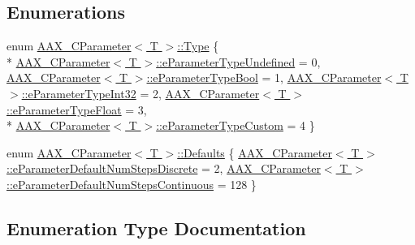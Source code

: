 \subsection*{Enumerations}
\begin{DoxyCompactItemize}
\item 
enum \hyperlink{a00344_ga04704f13b4367b9e7430217d06c5e4bd}{A\+A\+X\+\_\+\+C\+Parameter$<$ T $>$\+::\+Type} \{ \\*
\hyperlink{a00344_gga04704f13b4367b9e7430217d06c5e4bda15a8b9cd0a4d3acf30c476c7924b1753}{A\+A\+X\+\_\+\+C\+Parameter$<$ T $>$\+::e\+Parameter\+Type\+Undefined} = 0, 
\hyperlink{a00344_gga04704f13b4367b9e7430217d06c5e4bda9ae3d0eca8e95a572dba6daaf52144c0}{A\+A\+X\+\_\+\+C\+Parameter$<$ T $>$\+::e\+Parameter\+Type\+Bool} = 1, 
\hyperlink{a00344_gga04704f13b4367b9e7430217d06c5e4bda28e7aa1254f43cd377f0a0b9d2f29306}{A\+A\+X\+\_\+\+C\+Parameter$<$ T $>$\+::e\+Parameter\+Type\+Int32} = 2, 
\hyperlink{a00344_gga04704f13b4367b9e7430217d06c5e4bda82c99fa80b68022242f17adbc1dbf0dc}{A\+A\+X\+\_\+\+C\+Parameter$<$ T $>$\+::e\+Parameter\+Type\+Float} = 3, 
\\*
\hyperlink{a00344_gga04704f13b4367b9e7430217d06c5e4bda3503351122f63c767ca33d70aef69557}{A\+A\+X\+\_\+\+C\+Parameter$<$ T $>$\+::e\+Parameter\+Type\+Custom} = 4
 \}
\item 
enum \hyperlink{a00344_ga6bd5a5ddc796fa3a9de77157bf444ca8}{A\+A\+X\+\_\+\+C\+Parameter$<$ T $>$\+::\+Defaults} \{ \hyperlink{a00344_gga6bd5a5ddc796fa3a9de77157bf444ca8a511ee79dc3b6322b2facb41b2663be30}{A\+A\+X\+\_\+\+C\+Parameter$<$ T $>$\+::e\+Parameter\+Default\+Num\+Steps\+Discrete} = 2, 
\hyperlink{a00344_gga6bd5a5ddc796fa3a9de77157bf444ca8a54c0d050e5b34d4eb85c840168ec4567}{A\+A\+X\+\_\+\+C\+Parameter$<$ T $>$\+::e\+Parameter\+Default\+Num\+Steps\+Continuous} = 128
 \}
\end{DoxyCompactItemize}


\subsection{Enumeration Type Documentation}
\hypertarget{a00344_ga04704f13b4367b9e7430217d06c5e4bd}{}
